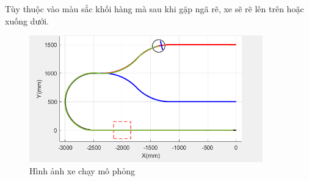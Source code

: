                \hspace*{0.6cm}Tùy thuộc vào màu sắc khối hàng mà sau khi gặp ngã rẽ, xe sẽ rẽ lên trên hoặc xuống dưới.
               \begin{figure}[H]
                    \centering
                    \includegraphics[width=0.9\textwidth]{pictures/chapter8/running.png}
                    \caption{Hình ảnh xe chạy mô phỏng}
                    \label{running}
               \end{figure}     

